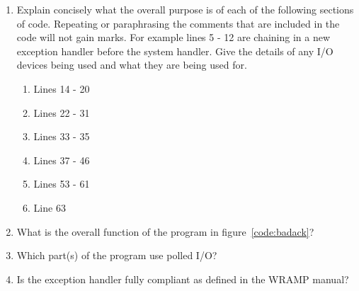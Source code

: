 \documentclass[a4paper,10pt]{article}
\begin{document}
\begin{enumerate}
\label{ques:badack}

\begin{enumerate}
\item Explain concisely what the overall purpose is of each of the following sections of code.  Repeating or paraphrasing the comments that are included in the code will not gain marks.  For example lines 5 - 12 are chaining in a new exception handler before the system handler. Give the details of any I/O devices being used and what they are being used for.

\begin{enumerate}
	\item Lines 14 - 20
	\item Lines 22 - 31
	\item Lines 33 - 35
	\item Lines 37 - 46
	\item Lines 53 - 61
	\item Line  63
\end{enumerate}



\item What is the overall function of the program in figure~\ref{code:badack}?

\item Which part(s) of the program use polled I/O?

\item Is the exception handler fully compliant as defined in the WRAMP manual?

\end{enumerate}


\end{enumerate}
\end{document}

